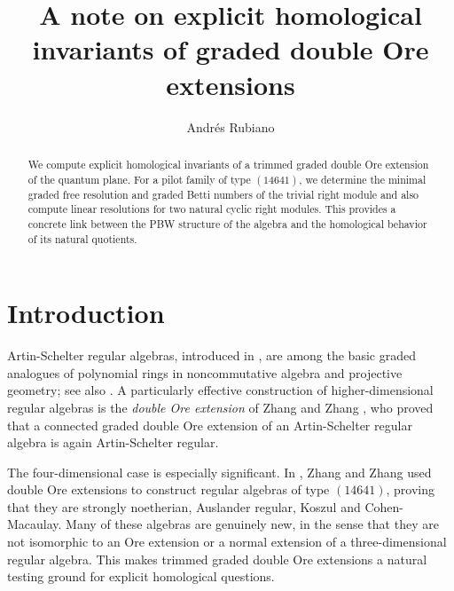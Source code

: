 \documentclass[reqno]{amsart}
\numberwithin{equation}{section}
\theoremstyle{definition}
\begin{document}
\title[Explicit homological invariants of graded double Ore extensions]{A note on explicit homological invariants of graded double Ore extensions}

\author{Andr\'es Rubiano}
\address{Universidad Distrital Francisco Jos\'e de Caldas}



\begin{abstract}
We compute explicit homological invariants of a trimmed graded double Ore extension of the quantum plane. For a pilot family of type \((14641)\), we determine the minimal graded free resolution and graded Betti numbers of the trivial right module and also compute linear resolutions for two natural cyclic right modules. This provides a concrete link between the PBW structure of the algebra and the homological behavior of its natural quotients.
\end{abstract}

\maketitle

\section{Introduction}

Artin-Schelter regular algebras, introduced in \cite{AS87}, are among the basic graded analogues of polynomial rings in noncommutative algebra and projective geometry; see also \cite{ATV91}. A particularly effective construction of higher-dimensional regular algebras is the \emph{double Ore extension} of Zhang and Zhang \cite{ZZ08}, who proved that a connected graded double Ore extension of an Artin-Schelter regular algebra is again Artin-Schelter regular.

The four-dimensional case is especially significant. In \cite{ZZ09}, Zhang and Zhang used double Ore extensions to construct regular algebras of type \((14641)\), proving that they are strongly noetherian, Auslander regular, Koszul and Cohen-Macaulay. Many of these algebras are genuinely new, in the sense that they are not isomorphic to an Ore extension or a normal extension of a three-dimensional regular algebra. This makes trimmed graded double Ore extensions a natural testing ground for explicit homological questions.
\end{document}
